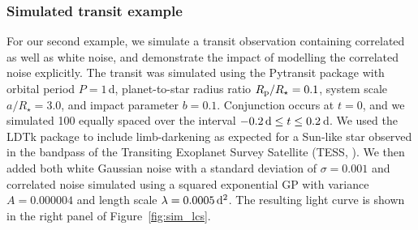 \documentclass[letterpaper]{ar-1col}
\newcommand{\suz}[1]{\textcolor{magenta}{#1}}
\newcommand{\dan}[1]{\textcolor{green}{#1}}
\begin{document}
\subsubsection{Simulated transit example}
\label{sec:sim_transit}

  
For our second example, we simulate a transit observation containing correlated as well as white noise, and demonstrate the impact of modelling the correlated noise explicitly. The transit was simulated using the {\sc Pytransit} package \citep{2015MNRAS.450.3233P} with orbital period $P=1$\,d, planet-to-star radius ratio $R_{\rm p}/R_\star=0.1$, system scale $a/R_\star=3.0$, and impact parameter $b=0.1$. Conjunction occurs at $t=0$, and we simulated 100 equally spaced over the interval $-0.2\,{\rm d} \le t \le 0.2$\,d. We used the {\sc LDTk} package \citep{2015MNRAS.453.3821P} to include limb-darkening as expected for a Sun-like star observed in the bandpass of the Transiting Exoplanet Survey Satellite (TESS, \citealt{2015JATIS...1a4003R}). We then added both white Gaussian noise with a standard deviation of $\sigma=0.001$ and correlated noise simulated using a squared exponential GP with variance $A=0.000004$ and length scale $\lambda=0.0005\,{\rm d}^2$. The resulting light curve is shown in the right panel of Figure~\ref{fig:sim_lcs}.
\end{document}
